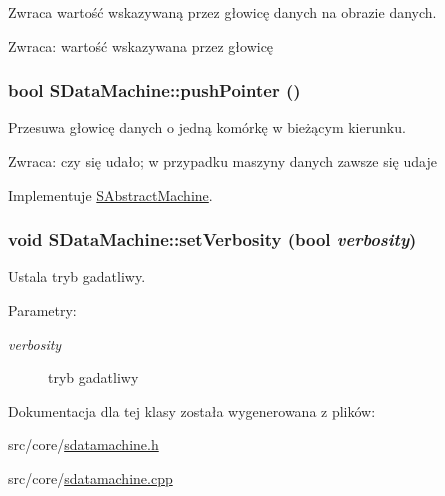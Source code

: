 Zwraca wartość wskazywaną przez głowicę danych na obrazie danych. \begin{Desc}
\item[Zwraca:]wartość wskazywana przez głowicę \end{Desc}
\hypertarget{classSDataMachine_10eb8f56cf6235455a26c5c673b8fe15}{
\subsubsection[{pushPointer}]{\setlength{\rightskip}{0pt plus 5cm}bool SDataMachine::pushPointer ()}}
\label{classSDataMachine_10eb8f56cf6235455a26c5c673b8fe15}


Przesuwa głowicę danych o jedną komórkę w bieżącym kierunku. \begin{Desc}
\item[Zwraca:]czy się udało; w przypadku maszyny danych zawsze się udaje \end{Desc}


Implementuje \hyperlink{classSAbstractMachine_72a47b72416e0d2f24fcf36415d37404}{SAbstractMachine}.\hypertarget{classSDataMachine_38cc38f27606be24fc609d461d25ae2f}{
\subsubsection[{setVerbosity}]{\setlength{\rightskip}{0pt plus 5cm}void SDataMachine::setVerbosity (bool {\em verbosity})}}
\label{classSDataMachine_38cc38f27606be24fc609d461d25ae2f}


Ustala tryb gadatliwy. \begin{Desc}
\item[Parametry:]
\begin{description}
\item[{\em verbosity}]tryb gadatliwy \end{description}
\end{Desc}


Dokumentacja dla tej klasy została wygenerowana z plików:\begin{CompactItemize}
\item 
src/core/\hyperlink{sdatamachine_8h}{sdatamachine.h}\item 
src/core/\hyperlink{sdatamachine_8cpp}{sdatamachine.cpp}\end{CompactItemize}
